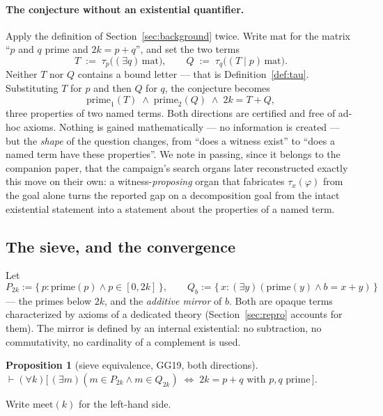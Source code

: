 \documentclass[11pt]{article}
\newtheorem{proposition}{Proposition}
\theoremstyle{remark}\newtheorem{remark}{Remark}
\begin{document}
\paragraph{The conjecture without an existential quantifier.} Apply the definition of
Section~\ref{sec:background} twice. Write $\mathrm{mat}$ for the matrix ``$p$ and $q$
prime and $2k = p+q$'', and set the two terms
\[
T \;:=\; \tau_p\bigl((\exists q)\,\mathrm{mat}\bigr),
\qquad
Q \;:=\; \tau_q\bigl((T \mid p)\,\mathrm{mat}\bigr) .
\]
Neither $T$ nor $Q$ contains a bound letter --- that is Definition~\ref{def:tau}.
Substituting $T$ for $p$ and then $Q$ for $q$, the conjecture becomes
\[
\mathrm{prime}_1(T) \;\wedge\; \mathrm{prime}_2(Q) \;\wedge\; 2k = T + Q ,
\]
three properties of two named terms. Both directions are certified and free of ad-hoc
axioms. Nothing is gained mathematically --- no information is created --- but the
\emph{shape} of the question changes, from ``does a witness exist'' to ``does a named
term have these properties''. We note in passing, since it belongs to the companion
paper, that the campaign's search organs later reconstructed exactly this move on their
own: a witness-\emph{proposing} organ that fabricates $\tau_x(\varphi)$ from the goal
alone turns the reported gap on a decomposition goal from the intact existential
statement into a statement about the properties of a named term.

\subsection{The sieve, and the convergence}

Let
\[
P_{2k} := \{\, p : \mathrm{prime}(p) \wedge p \in [0,2k] \,\},
\qquad
Q_{b} := \{\, x : (\exists y)(\mathrm{prime}(y) \wedge b = x + y) \,\}
\]
--- the primes below $2k$, and the \emph{additive mirror} of $b$. Both are opaque terms
characterized by axioms of a dedicated theory (Section~\ref{sec:repro} accounts for
them). The mirror is defined by an internal existential: no subtraction, no
commutativity, no cardinality of a complement is used.

\begin{proposition}[sieve equivalence, GG19, both directions]
$\vdash (\forall k)\bigl[\, (\exists m)(m \in P_{2k} \wedge m \in Q_{2k})
\;\Longleftrightarrow\; 2k = p+q \text{ with } p,q \text{ prime} \,\bigr]$.
\end{proposition}

Write $\mathrm{meet}(k)$ for the left-hand side.
\end{document}
